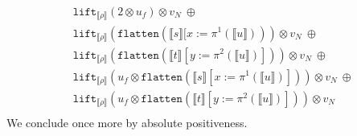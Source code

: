 \documentclass[runningheads,a4paper]{llncs}
\newcommand{\typeinterpret}[1]{\llbracket #1 \rrbracket}
\newcommand{\interpret}[1]{\llbracket #1 \rrbracket}
\newcommand{\flatten}{\mathtt{flatten}}
\newcommand{\lift}{\mathtt{lift}}
\begin{document}
\begin{itemize}
\[\begin{array}{l}
  \phantom{A}
  \lift_{\typeinterpret{\rho}}(2 \otimes u_f) \otimes v_N\ \oplus \\
  \phantom{A}
  \lift_{\typeinterpret{\rho}}(\flatten(\interpret{s}[x:=
    \pi^1(\interpret{u}))) \otimes v_N\ \oplus \\
  \phantom{A}
  \lift_{\typeinterpret{\rho}}(\flatten(\interpret{t}[y:=
    \pi^2(\interpret{u})])) \otimes v_N\ \oplus \\
  \phantom{A}
  \lift_{\typeinterpret{\rho}}(u_f \otimes
    \flatten(\interpret{s}[x:=\pi^1(\interpret{u})])) \otimes v_N\ 
    \oplus \\
  \phantom{A}
  \lift_{\typeinterpret{\rho}}(u_f \otimes\flatten(\interpret{t}[y:=
    \pi^2(\interpret{u})])) \otimes v_N \\
  \end{array}
  \]
  We conclude once more by absolute positiveness.
\end{itemize}
\end{document}
